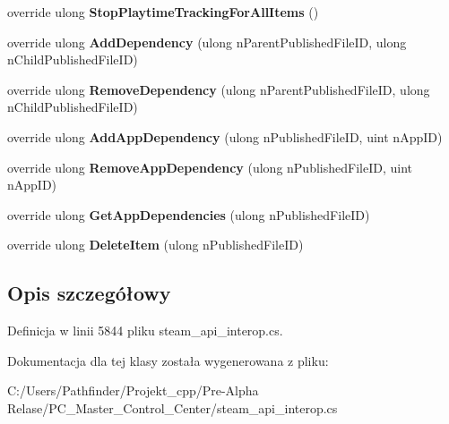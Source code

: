 \begin{DoxyCompactItemize}
override ulong {\bfseries Stop\+Playtime\+Tracking\+For\+All\+Items} ()
\item 
\mbox{\label{class_valve_1_1_steamworks_1_1_c_steam_u_g_c_af377eedf0a83c8c75c5c908e8f5dae26}} 
override ulong {\bfseries Add\+Dependency} (ulong n\+Parent\+Published\+File\+ID, ulong n\+Child\+Published\+File\+ID)
\item 
\mbox{\label{class_valve_1_1_steamworks_1_1_c_steam_u_g_c_ae7ad6bc9169e2503069bdf4a62385ace}} 
override ulong {\bfseries Remove\+Dependency} (ulong n\+Parent\+Published\+File\+ID, ulong n\+Child\+Published\+File\+ID)
\item 
\mbox{\label{class_valve_1_1_steamworks_1_1_c_steam_u_g_c_ab4f6021b23e4cb6982c8574343409943}} 
override ulong {\bfseries Add\+App\+Dependency} (ulong n\+Published\+File\+ID, uint n\+App\+ID)
\item 
\mbox{\label{class_valve_1_1_steamworks_1_1_c_steam_u_g_c_a49072fde72835e8d38cf4b538478e238}} 
override ulong {\bfseries Remove\+App\+Dependency} (ulong n\+Published\+File\+ID, uint n\+App\+ID)
\item 
\mbox{\label{class_valve_1_1_steamworks_1_1_c_steam_u_g_c_a2e1a71348c842bb0e2a783e81dce2118}} 
override ulong {\bfseries Get\+App\+Dependencies} (ulong n\+Published\+File\+ID)
\item 
\mbox{\label{class_valve_1_1_steamworks_1_1_c_steam_u_g_c_af61ace6ada78b3157e6046ca66f19b07}} 
override ulong {\bfseries Delete\+Item} (ulong n\+Published\+File\+ID)
\end{DoxyCompactItemize}


\subsection{Opis szczegółowy}


Definicja w linii 5844 pliku steam\+\_\+api\+\_\+interop.\+cs.



Dokumentacja dla tej klasy została wygenerowana z pliku\+:\begin{DoxyCompactItemize}
\item 
C\+:/\+Users/\+Pathfinder/\+Projekt\+\_\+cpp/\+Pre-\/\+Alpha Relase/\+P\+C\+\_\+\+Master\+\_\+\+Control\+\_\+\+Center/steam\+\_\+api\+\_\+interop.\+cs\end{DoxyCompactItemize}
